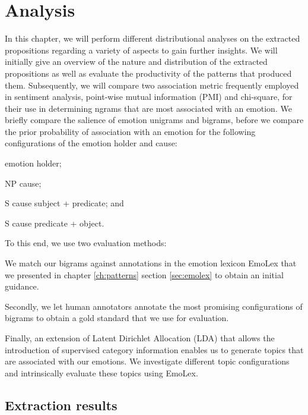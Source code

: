 
\chapter{Analysis} %

\label{ch:analysis} %

In this chapter, we will perform different distributional analyses on the extracted propositions regarding a variety of aspects to gain further insights. We will initially give an overview of the nature and distribution of the extracted propositions as well as evaluate the productivity of the patterns that produced them.
Subsequently, we will compare two association metric frequently employed in sentiment analysis, point-wise mutual information (PMI) and chi-square, for their use in determining ngrams that are most associated with an emotion. We briefly compare the salience of emotion unigrams and bigrams, before we compare the prior probability of association with an emotion for the following configurations of the emotion holder and cause: \begin{inparaenum} \item emotion holder; \item NP cause; \item S cause subject + predicate; and \item S cause predicate + object. \end{inparaenum} To this end, we use two evaluation methods: \begin{inparaenum} \item We match our bigrams against annotations in the emotion lexicon EmoLex \cite{nrc_emolex} that we presented in chapter \ref{ch:patterns} section \ref{sec:emolex} to obtain an initial guidance. \item Secondly, we let human annotators annotate the most promising configurations of bigrams to obtain a gold standard that we use for evaluation. \end{inparaenum} Finally, an extension of Latent Dirichlet Allocation (LDA) that allows the introduction of supervised category information enables us to generate topics that are associated with our emotions. We investigate different topic configurations and intrinsically evaluate these topics using EmoLex.

\section{Extraction results}

